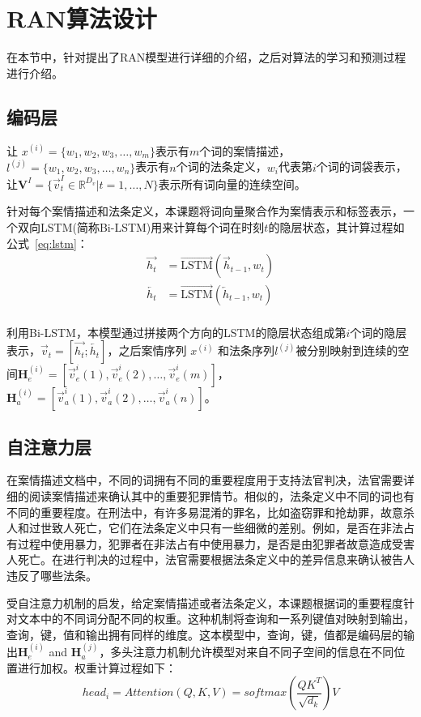 \section{RAN算法设计}
在本节中，针对提出了RAN模型进行详细的介绍，之后对算法的学习和预测过程进行介绍。
\label{sec:ran_algori}
\subsection{编码层}
让 $x^{(i)} = {\{w_1, w_2, w_3, \dots, w_m\}}$表示有$m$个词的案情描述， $l^{(j)} = {\{w_1, w_2, w_3, \dots, w_n\}}$表示有$n$个词的法条定义，$w_i$代表第$i$个词的词袋表示，让$\textbf{V}^I=\{\vec{v}^I_t\in \mathbb{R}^{D_v}|t=1,\dots,N\}$表示所有词向量的连续空间。

针对每个案情描述和法条定义，本课题将词向量聚合作为案情表示和标签表示，一个双向LSTM(简称Bi-LSTM)用来计算每个词在时刻$t$的隐层状态，其计算过程如公式~\ref{eq:lstm}：
\begin{equation}\label{eq:lstm}
    \begin{aligned}
        \overrightarrow{h_t}&=\overrightarrow{\text{LSTM}}(\overrightarrow{h}_{t-1}, w_t)\\
        \overleftarrow{h_t}&=\overrightarrow{\text{LSTM}}(\overleftarrow{h}_{t-1}, w_t)\\
    \end{aligned}
\end{equation}

利用Bi-LSTM，本模型通过拼接两个方向的LSTM的隐层状态组成第$i$个词的隐层表示，$\vec{v}_t=[\overrightarrow{h_t};\overleftarrow{h_t}]$，之后案情序列 $x^{(i)}$ 和法条序列$l^{(j)}$被分别映射到连续的空间$\textbf{H}_e^{(i)}=[\vec{v}_e^{i}(1), \vec{v}_e^{i}(2), \dots, \vec{v}_e^{i}(m)]$，
$\textbf{H}_a^{(i)}=[\vec{v}_a^{i}(1), \vec{v}_a^{i}(2), \dots, \vec{v}_a^{i}(n)]$。
\subsection{自注意力层}

在案情描述文档中，不同的词拥有不同的重要程度用于支持法官判决，法官需要详细的阅读案情描述来确认其中的重要犯罪情节。相似的，法条定义中不同的词也有不同的重要程度。在刑法中，有许多易混淆的罪名，比如盗窃罪和抢劫罪，故意杀人和过世致人死亡，它们在法条定义中只有一些细微的差别。例如，是否在非法占有过程中使用暴力，犯罪者在非法占有中使用暴力，是否是由犯罪者故意造成受害人死亡。在进行判决的过程中，法官需要根据法条定义中的差异信息来确认被告人违反了哪些法条。

受自注意力机制\cite{VaswaniSPUJGKP17}的启发，给定案情描述或者法条定义，本课题根据词的重要程度针对文本中的不同词分配不同的权重。这种机制将查询和一系列键值对映射到输出，查询，键，值和输出拥有同样的维度。这本模型中，查询，键，值都是编码层的输出$\textbf{H}_e^{(i)}$ and $\textbf{H}_a^{(j)}$，多头注意力机制允许模型对来自不同子空间的信息在不同位置进行加权。权重计算过程如下：
\begin{equation}\label{eq:self_attention}
    head_i = Attention(Q,K,V) = softmax(\frac{QK^{T}}{\sqrt{d_k}})V
\end{equation}

